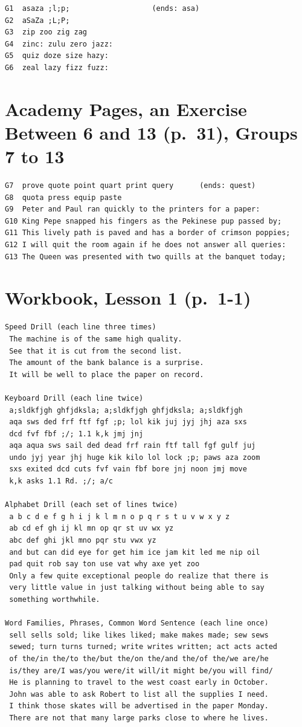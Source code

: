 \begin{Verbatim}
G1  asaza ;l;p;                   (ends: asa)
G2  aSaZa ;L;P;
G3  zip zoo zig zag
G4  zinc: zulu zero jazz:
G5  quiz doze size hazy:
G6  zeal lazy fizz fuzz:
\end{Verbatim}

\section{Academy Pages, an Exercise Between 6 and 13 (p.\ 31), Groups 7 to 13}

\begin{Verbatim}
G7  prove quote point quart print query      (ends: quest)
G8  quota press equip paste
G9  Peter and Paul ran quickly to the printers for a paper:
G10 King Pepe snapped his fingers as the Pekinese pup passed by;
G11 This lively path is paved and has a border of crimson poppies;
G12 I will quit the room again if he does not answer all queries:
G13 The Queen was presented with two quills at the banquet today;
\end{Verbatim}

\section{Workbook, Lesson 1 (p.\ 1-1)}

\begin{Verbatim}
Speed Drill (each line three times)
 The machine is of the same high quality.
 See that it is cut from the second list.
 The amount of the bank balance is a surprise.
 It will be well to place the paper on record.

Keyboard Drill (each line twice)
 a;sldkfjgh ghfjdksla; a;sldkfjgh ghfjdksla; a;sldkfjgh
 aqa sws ded frf ftf fgf ;p; lol kik juj jyj jhj aza sxs
 dcd fvf fbf ;/; 1.1 k,k jmj jnj
 aqa aqua sws sail ded dead frf rain ftf tall fgf gulf juj
 undo jyj year jhj huge kik kilo lol lock ;p; paws aza zoom
 sxs exited dcd cuts fvf vain fbf bore jnj noon jmj move
 k,k asks 1.1 Rd. ;/; a/c

Alphabet Drill (each set of lines twice)
 a b c d e f g h i j k l m n o p q r s t u v w x y z
 ab cd ef gh ij kl mn op qr st uv wx yz
 abc def ghi jkl mno pqr stu vwx yz
 and but can did eye for get him ice jam kit led me nip oil
 pad quit rob say ton use vat why axe yet zoo
 Only a few quite exceptional people do realize that there is
 very little value in just talking without being able to say
 something worthwhile.

Word Families, Phrases, Common Word Sentence (each line once)
 sell sells sold; like likes liked; make makes made; sew sews
 sewed; turn turns turned; write writes written; act acts acted
 of the/in the/to the/but the/on the/and the/of the/we are/he
 is/they are/I was/you were/it will/it might be/you will find/
 He is planning to travel to the west coast early in October.
 John was able to ask Robert to list all the supplies I need.
 I think those skates will be advertised in the paper Monday.
 There are not that many large parks close to where he lives.
\end{Verbatim}

